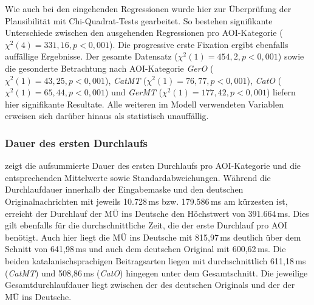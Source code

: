 Wie auch bei den eingehenden Regressionen wurde hier zur Überprüfung der Plausibilität mit Chi-Quadrat-Tests gearbeitet. So bestehen signifikante Unterschiede zwischen den ausgehenden Regressionen pro AOI-Kategorie ($\chi^2(4) = 331,16, p < 0,001$). Die progressive erste Fixation ergibt ebenfalls auffällige Ergebnisse. Der gesamte Datensatz ($\chi^2(1) = 454,2, p < 0,001$) sowie die gesonderte Betrachtung nach AOI-Kategorie \emph{GerO} ($\chi^2(1) = 43,25, p < 0,001$), \emph{CatMT} ($\chi^2(1) = 76,77, p < 0,001$), \emph{CatO} ($\chi^2(1) = 65,44, p < 0,001$) und \emph{GerMT} ($\chi^2(1) = 177,42, p < 0,001$) liefern hier signifikante Resultate. Alle weiteren im Modell verwendeten Variablen erweisen sich darüber hinaus als statistisch unauffällig.




\subsubsection{Dauer des ersten Durchlaufs}

\label{K6:subsubsec:iafrd:catde}

\begin{sloppypar}
 zeigt die aufsummierte Dauer des ersten Durchlaufs pro AOI-Kategorie und die entsprechenden Mittelwerte sowie Standardabweichungen. Während die Durchlaufdauer innerhalb der Eingabemaske und den deutschen Originalnachrichten mit jeweils 10.728\,ms bzw. 179.586\,ms am kürzesten ist, erreicht der Durchlauf der MÜ ins Deutsche den Höchstwert von 391.664\,ms. Dies gilt ebenfalls für die durchschnittliche Zeit, die der erste Durchlauf pro AOI benötigt. Auch hier liegt die MÜ ins Deutsche mit 815,97\,ms deutlich über dem Schnitt von 641,98\,ms und auch dem deutschen Original mit 600,62\,ms. Die beiden katalanischsprachigen Beitragsarten liegen mit durchschnittlich 611,18\,ms (\emph{CatMT}) und 508,86\,ms (\emph{CatO}) hingegen unter dem Gesamtschnitt. Die jeweilige Gesamtdurchlaufdauer liegt zwischen der des deutschen Originals und der der MÜ ins Deutsche.
\end{sloppypar}


